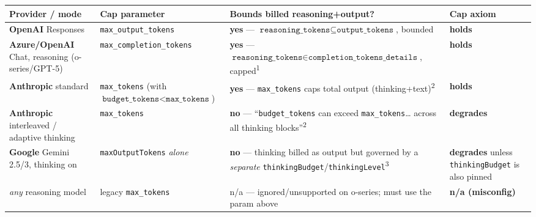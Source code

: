 \documentclass[11pt]{article}
\theoremstyle{plain}
\begin{document}
\begin{center}\footnotesize
\begin{tabular}{@{}R{3.1cm}R{3.3cm}R{5.1cm}R{2.4cm}@{}}
\toprule
Provider / mode & Cap parameter & Bounds billed reasoning+output? & Cap axiom \\
\midrule
\textbf{OpenAI} Responses & \texttt{max\_output\_tokens} &
  \textbf{yes} --- $\texttt{reasoning\_tokens} \subseteq \texttt{output\_tokens}$, bounded &
  \textbf{holds} \\
\textbf{Azure/OpenAI} Chat, reasoning (o-series/GPT-5) & \texttt{max\_completion\_tokens} &
  \textbf{yes} --- $\texttt{reasoning\_tokens} \in \texttt{completion\_tokens\_details}$,
  capped\textsuperscript{1} & \textbf{holds} \\
\textbf{Anthropic} standard & \texttt{max\_tokens} (with $\texttt{budget\_tokens} <
  \texttt{max\_tokens}$) & \textbf{yes} --- \texttt{max\_tokens} caps total output
  (thinking+text)\textsuperscript{2} & \textbf{holds} \\
\textbf{Anthropic} interleaved / adaptive thinking & \texttt{max\_tokens} &
  \textbf{no} --- ``\texttt{budget\_tokens} can exceed \texttt{max\_tokens}\dots{} across all
  thinking blocks''\textsuperscript{2} & \textbf{degrades} \\
\textbf{Google} Gemini 2.5/3, thinking on & \texttt{maxOutputTokens} \emph{alone} &
  \textbf{no} --- thinking billed as output but governed by a \emph{separate}
  \texttt{thinkingBudget}/\texttt{thinkingLevel}\textsuperscript{3} &
  \textbf{degrades} unless \texttt{thinkingBudget} is also pinned \\
\emph{any} reasoning model & legacy \texttt{max\_tokens} &
  n/a --- ignored/unsupported on o-series; must use the param above & \textbf{n/a (misconfig)} \\
\bottomrule
\end{tabular}
\end{center}

\end{document}
